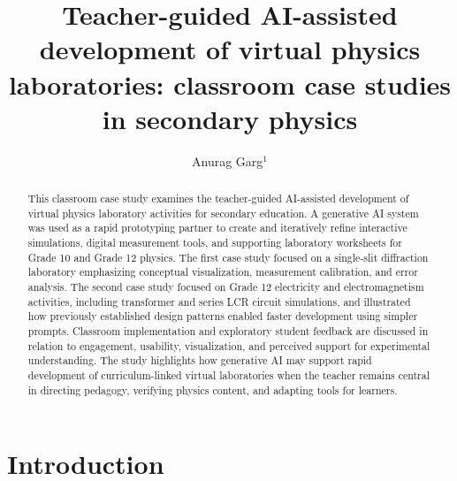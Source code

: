 \documentclass{iopjournal}
\begin{document}

\title{Teacher-guided AI-assisted development of virtual physics laboratories: classroom case studies in secondary physics}

\author{Anurag Garg$^1$}





\begin{abstract}
This classroom case study examines the teacher-guided AI-assisted development of virtual physics laboratory activities for secondary education. A generative AI system was used as a rapid prototyping partner to create and iteratively refine interactive simulations, digital measurement tools, and supporting laboratory worksheets for Grade 10 and Grade 12 physics. The first case study focused on a single-slit diffraction laboratory emphasizing conceptual visualization, measurement calibration, and error analysis. The second case study focused on Grade 12 electricity and electromagnetism activities, including transformer and series LCR circuit simulations, and illustrated how previously established design patterns enabled faster development using simpler prompts. Classroom implementation and exploratory student feedback are discussed in relation to engagement, usability, visualization, and perceived support for experimental understanding. The study highlights how generative AI may support rapid development of curriculum-linked virtual laboratories when the teacher remains central in directing pedagogy, verifying physics content, and adapting tools for learners.
\end{abstract}

\section{Introduction}
\end{document}
